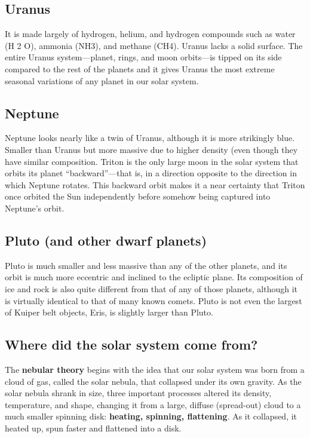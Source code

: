\documentclass[12pt]{article}
\begin{document}
\subsection{Uranus}
It is made largely of hydrogen, helium, and hydrogen compounds such as water (H 2 O), ammonia (NH3), and methane (CH4). Uranus lacks a solid surface. The entire Uranus system—planet, rings, and moon orbits—is tipped on its side compared to the rest of the planets and it gives Uranus the most extreme seasonal variations of any planet in our solar system.

\subsection {Neptune}
Neptune looks nearly like a twin of Uranus, although it is more strikingly blue. Smaller than Uranus but more massive due to higher density (even though they have similar composition. Triton is the only large moon in the solar system that orbits its planet “backward”—that is, in a direction opposite to the direction in which Neptune rotates. This backward orbit makes it a near certainty that Triton once orbited the Sun independently before somehow being captured into Neptune’s orbit.

\subsection {Pluto (and other dwarf planets)}
Pluto is much smaller and less massive than any of the other planets, and its orbit is much more eccentric and inclined to the ecliptic plane. Its composition of ice and rock is also quite different from that of any of those planets, although it is virtually identical to that of many known comets. Pluto is not even the largest of Kuiper belt objects, Eris, is slightly larger than Pluto.

\subsection{Where did the solar system come from?}
The {\bf nebular theory} begins with the idea that our solar system was born from a cloud of gas, called the solar nebula, that collapsed under its own gravity. As the solar nebula shrank in size, three important processes altered its density, temperature, and shape, changing it from a large, diffuse (spread-out) cloud to a much smaller spinning disk: {\bf heating, spinning, flattening}. As it collapsed, it heated up, spun faster and flattened into a disk.
\end{document}
